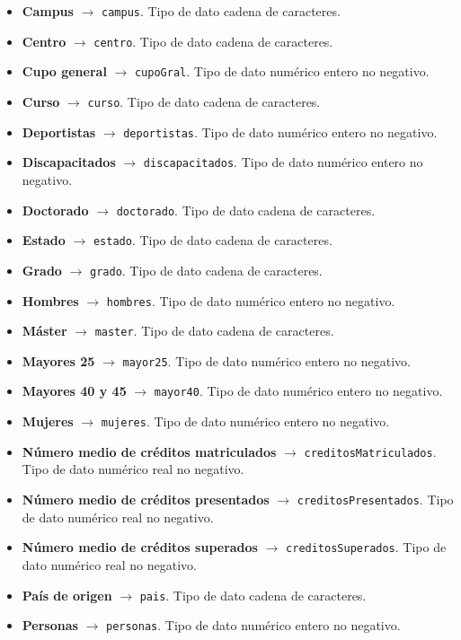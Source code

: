\begin{itemize}
	\item \textbf{Campus} $\rightarrow$ {\tt campus}. Tipo de dato cadena de caracteres.
	\item \textbf{Centro} $\rightarrow$ {\tt centro}. Tipo de dato cadena de caracteres.
	\item \textbf{Cupo general} $\rightarrow$ {\tt cupoGral}. Tipo de dato numérico entero no negativo.
	\item \textbf{Curso} $\rightarrow$ {\tt curso}. Tipo de dato cadena de caracteres.
	\item \textbf{Deportistas} $\rightarrow$ {\tt deportistas}. Tipo de dato numérico entero no negativo.
	\item \textbf{Discapacitados} $\rightarrow$ {\tt discapacitados}. Tipo de dato numérico entero no negativo.
	\item \textbf{Doctorado} $\rightarrow$ {\tt doctorado}. Tipo de dato cadena de caracteres.
	\item \textbf{Estado} $\rightarrow$ {\tt estado}. Tipo de dato cadena de caracteres.
	\item \textbf{Grado} $\rightarrow$ {\tt grado}. Tipo de dato cadena de caracteres.
	\item \textbf{Hombres} $\rightarrow$ {\tt hombres}. Tipo de dato numérico entero no negativo.
	\item \textbf{Máster} $\rightarrow$ {\tt master}. Tipo de dato cadena de caracteres.
	\item \textbf{Mayores 25} $\rightarrow$ {\tt mayor25}. Tipo de dato numérico entero no negativo.
	\item \textbf{Mayores 40 y 45 } $\rightarrow$ {\tt mayor40}. Tipo de dato numérico entero no negativo.
	\item \textbf{Mujeres} $\rightarrow$ {\tt mujeres}. Tipo de dato numérico entero no negativo.
	\item \textbf{Número medio de créditos matriculados} $\rightarrow$ {\tt creditosMatriculados}. Tipo de dato numérico real no negativo.
	\item \textbf{Número medio de créditos presentados} $\rightarrow$ {\tt creditosPresentados}. Tipo de dato numérico real no negativo.
	\item \textbf{Número medio de créditos superados} $\rightarrow$ {\tt creditosSuperados}. Tipo de dato numérico real no negativo.
	\item \textbf{País de origen} $\rightarrow$ {\tt pais}. Tipo de dato cadena de caracteres.
	\item \textbf{Personas} $\rightarrow$ {\tt personas}. Tipo de dato numérico entero no negativo.

\end{itemize}

